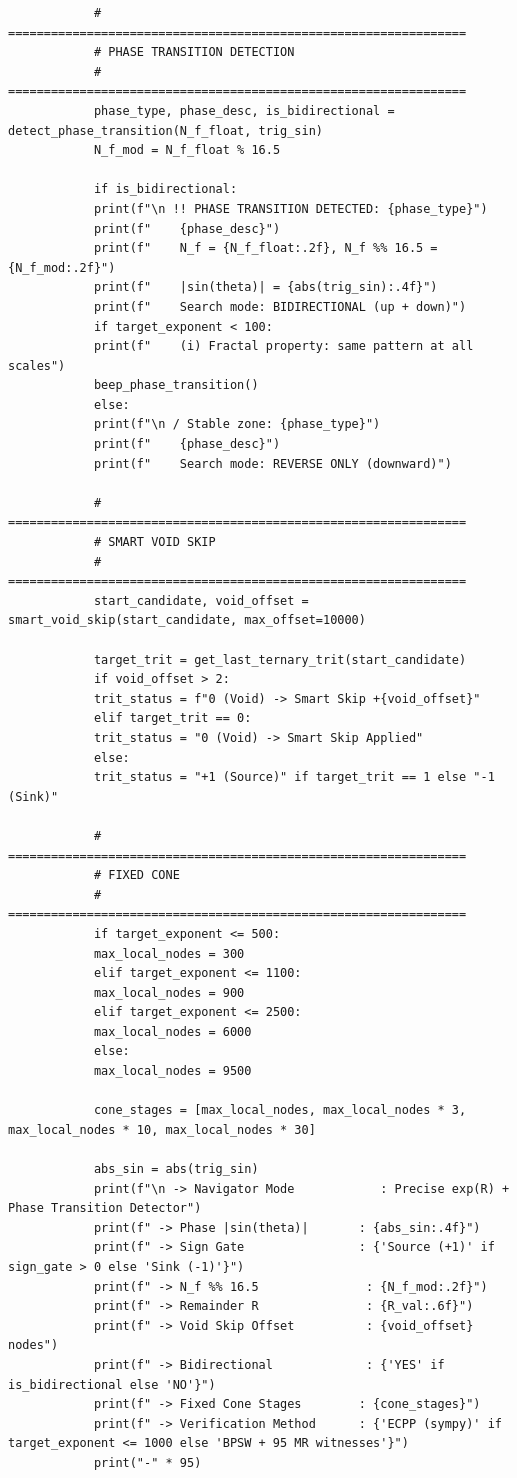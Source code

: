 \documentclass[12pt,a4paper]{article}
\theoremstyle{remark}
\begin{document}
\begin{tcolorbox}
\begin{lstlisting}
			# ================================================================
			# PHASE TRANSITION DETECTION
			# ================================================================
			phase_type, phase_desc, is_bidirectional = detect_phase_transition(N_f_float, trig_sin)
			N_f_mod = N_f_float % 16.5
			
			if is_bidirectional:
			print(f"\n !! PHASE TRANSITION DETECTED: {phase_type}")
			print(f"    {phase_desc}")
			print(f"    N_f = {N_f_float:.2f}, N_f %% 16.5 = {N_f_mod:.2f}")
			print(f"    |sin(theta)| = {abs(trig_sin):.4f}")
			print(f"    Search mode: BIDIRECTIONAL (up + down)")
			if target_exponent < 100:
			print(f"    (i) Fractal property: same pattern at all scales")
			beep_phase_transition()
			else:
			print(f"\n / Stable zone: {phase_type}")
			print(f"    {phase_desc}")
			print(f"    Search mode: REVERSE ONLY (downward)")
			
			# ================================================================
			# SMART VOID SKIP
			# ================================================================
			start_candidate, void_offset = smart_void_skip(start_candidate, max_offset=10000)
			
			target_trit = get_last_ternary_trit(start_candidate)
			if void_offset > 2:
			trit_status = f"0 (Void) -> Smart Skip +{void_offset}"
			elif target_trit == 0:
			trit_status = "0 (Void) -> Smart Skip Applied"
			else:
			trit_status = "+1 (Source)" if target_trit == 1 else "-1 (Sink)"
			
			# ================================================================
			# FIXED CONE
			# ================================================================
			if target_exponent <= 500:
			max_local_nodes = 300
			elif target_exponent <= 1100:
			max_local_nodes = 900
			elif target_exponent <= 2500:
			max_local_nodes = 6000
			else:
			max_local_nodes = 9500
			
			cone_stages = [max_local_nodes, max_local_nodes * 3, max_local_nodes * 10, max_local_nodes * 30]
			
			abs_sin = abs(trig_sin)
			print(f"\n -> Navigator Mode            : Precise exp(R) + Phase Transition Detector")
			print(f" -> Phase |sin(theta)|       : {abs_sin:.4f}")
			print(f" -> Sign Gate                : {'Source (+1)' if sign_gate > 0 else 'Sink (-1)'}")
			print(f" -> N_f %% 16.5               : {N_f_mod:.2f}")
			print(f" -> Remainder R               : {R_val:.6f}")
			print(f" -> Void Skip Offset          : {void_offset} nodes")
			print(f" -> Bidirectional             : {'YES' if is_bidirectional else 'NO'}")
			print(f" -> Fixed Cone Stages        : {cone_stages}")
			print(f" -> Verification Method      : {'ECPP (sympy)' if target_exponent <= 1000 else 'BPSW + 95 MR witnesses'}")
			print("-" * 95)
			

\end{lstlisting}
\end{tcolorbox}
\end{document}

